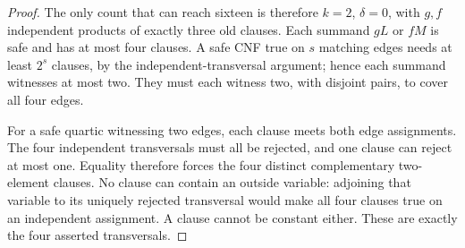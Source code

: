 \begin{proof}
The only count that can reach sixteen is therefore $k=2$, $\delta=0$, with $g,f$ independent products of exactly three old clauses. Each summand $gL$ or $fM$ is safe and has at most four clauses. A safe CNF true on $s$ matching edges needs at least $2^s$ clauses, by the independent-transversal argument; hence each summand witnesses at most two. They must each witness two, with disjoint pairs, to cover all four edges.

For a safe quartic witnessing two edges, each clause meets both edge assignments. The four independent transversals must all be rejected, and one clause can reject at most one. Equality therefore forces the four distinct complementary two-element clauses. No clause can contain an outside variable: adjoining that variable to its uniquely rejected transversal would make all four clauses true on an independent assignment. A clause cannot be constant either. These are exactly the four asserted transversals.
\end{proof}

